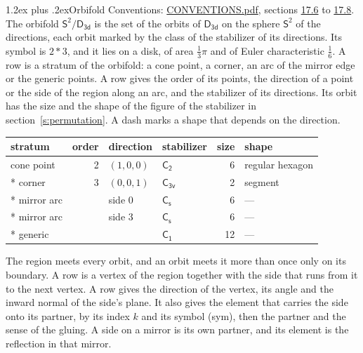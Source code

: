 \documentclass[10pt,a4paper]{article}
\makeatletter
\renewcommand\section{\@startsection{section}{1}{\z@}{-3ex plus -1ex minus -.2ex}%
  {1.2ex plus .2ex}{\normalfont\large\sffamily\bfseries\color{parttitle}}}
\numberwithin{equation}{section}
\newcommand{\grp}[1]{\mathsf{#1}}
\newcommand{\orbname}[1]{#1}
\newcommand{\dirvec}[3]{(#1, #2, #3)}
\newcommand{\twosphere}{\mathsf{S}^{2}}
\makeatother
\begin{document}
\section{Orbifold}\label{s:orbifold}
Conventions: \href{../../CONVENTIONS.pdf}{CONVENTIONS.pdf}, sections \href{../../CONVENTIONS.pdf\#conv.17.6}{17.6} to \href{../../CONVENTIONS.pdf\#conv.17.8}{17.8}.
The orbifold $\twosphere/\grp{D_{3d}}$ is the set of the orbits of $\grp{D_{3d}}$ on the sphere $\twosphere$ of the directions, each orbit marked by the class of the stabilizer of its directions. Its symbol is $\orbname{2{\ast}3}$, and it lies on a disk, of area $\tfrac{1}{3}\pi$ and of Euler characteristic $\tfrac{1}{6}$.
\leavevmode\label{n:head.stratum}\label{n:head.order.point}\label{n:head.direction}\label{n:head.stabilizer}\label{n:head.size.orbit}\label{n:head.shape}A row is a stratum of the orbifold: a cone point, a corner, an arc of the mirror edge or the generic points. A row gives the order of its points, the direction of a point or the side of the region along an arc, and the stabilizer of its directions. Its orbit has the size and the shape of the figure of the stabilizer in section~\ref{s:permutation}. A dash marks a shape that depends on the direction.
{\small\setlength{\tabcolsep}{4pt}\begin{longtable}{@{}lrllrl@{}}\toprule
stratum & order & direction & stabilizer & size & shape\\\midrule\endhead
\bottomrule\endfoot\endlastfoot
cone point & 2 & $\dirvec{1}{0}{0}$ & \href{C2.pdf}{$\grp{C_{2}}$} & 6 & regular hexagon\\*
corner & 3 & $\dirvec{0}{0}{1}$ & \href{C3v.pdf}{$\grp{C_{3v}}$} & 2 & segment\\*
mirror arc &  & side 0 & \href{C1v.pdf}{$\grp{C_{s}}$} & 6 & ---\\*
mirror arc &  & side 3 & \href{C1v.pdf}{$\grp{C_{s}}$} & 6 & ---\\*
generic &  &  & \href{C1.pdf}{$\grp{C_{1}}$} & 12 & ---\\
\bottomrule\end{longtable}}
\leavevmode\label{n:head.vertex.region}\label{n:head.angle}\label{n:head.normal.side}\label{n:head.partner}\label{n:head.sense}The region meets every orbit, and an orbit meets it more than once only on its boundary. A row is a vertex of the region together with the side that runs from it to the next vertex. A row gives the direction of the vertex, its angle and the inward normal of the side's plane. It also gives the element that carries the side onto its partner, by its index $k$ and its symbol (sym), then the partner and the sense of the gluing. A side on a mirror is its own partner, and its element is the reflection in that mirror.
\end{document}
